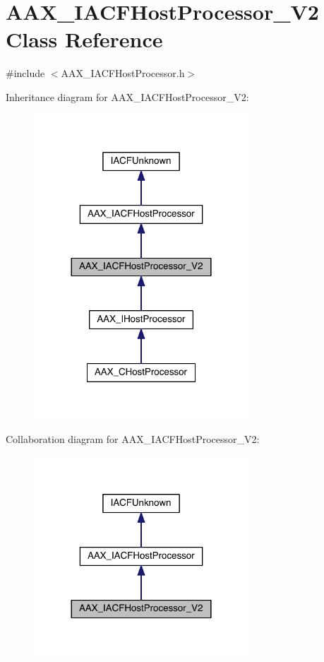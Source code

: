 \hypertarget{a00067}{}\section{A\+A\+X\+\_\+\+I\+A\+C\+F\+Host\+Processor\+\_\+\+V2 Class Reference}
\label{a00067}


{\ttfamily \#include $<$A\+A\+X\+\_\+\+I\+A\+C\+F\+Host\+Processor.\+h$>$}



Inheritance diagram for A\+A\+X\+\_\+\+I\+A\+C\+F\+Host\+Processor\+\_\+\+V2\+:
\nopagebreak
\begin{figure}[H]
\begin{center}
\leavevmode
\includegraphics[width=228pt]{a00544}
\end{center}
\end{figure}


Collaboration diagram for A\+A\+X\+\_\+\+I\+A\+C\+F\+Host\+Processor\+\_\+\+V2\+:
\nopagebreak
\begin{figure}[H]
\begin{center}
\leavevmode
\includegraphics[width=228pt]{a00545}
\end{center}
\end{figure}


